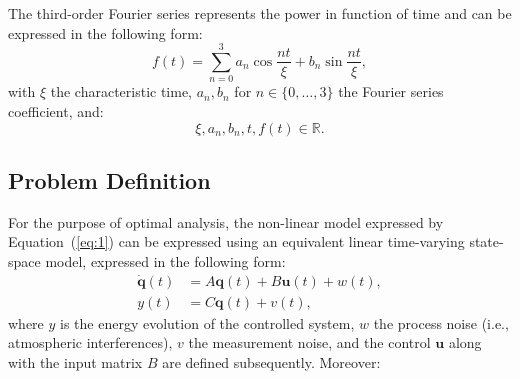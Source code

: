 \documentclass[letterpaper,10pt,conference]{ieeeconf}
\begin{document}
The third-order Fourier series represents the power in function of time and can be expressed in the following form:
\begin{equation}\label{eq:1}
  f(t)=\sum_{n=0}^{3}{a_n\cos{\frac{nt}{\xi}}+b_n\sin{\frac{nt}{\xi}}},
\end{equation}
with $\xi$ the characteristic time, $a_n, b_n$ for $n\in\{0,\dotsc,3\}$ the Fourier series coefficient, and:
\begin{equation}
  \xi,a_n,b_n,t,f(t)\in\mathbb{R}.
\end{equation}

\subsection{Problem Definition}

For the purpose of optimal analysis, the non-linear model expressed by Equation~(\ref{eq:1}) can be expressed using an equivalent linear time-varying state-space model, expressed in the following form:
\begin{equation}\begin{split}\label{eq:3}
  \dot{\mathbf{q}}(t)&=A\mathbf{q}(t)+B\mathbf{u}(t)+w(t),\\
  y(t)&=C\mathbf{q}(t)+v(t),
\end{split}\end{equation}
where $y$ is the energy evolution of the controlled system, $w$ the process noise (i.e., atmospheric interferences), $v$ the measurement noise, and the control $\mathbf{u}$ along with the input matrix $B$ are defined subsequently. Moreover:
\end{document}
